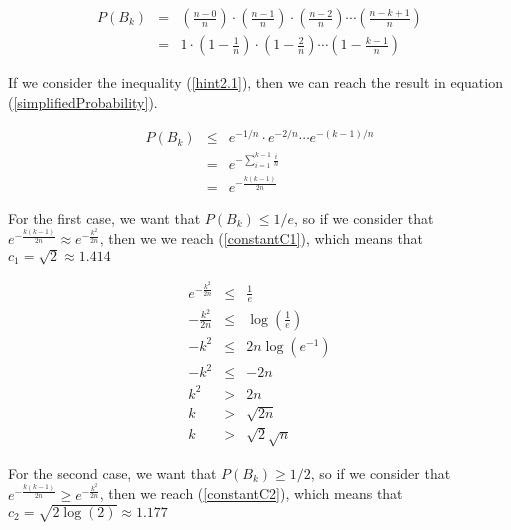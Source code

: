 \documentclass[tikz, 12pt]{scrartcl}
\begin{document}
\begin{enumerate}
	\begin{eqnarray}
	P(B_k) 	&	=	&	\left( \frac{n - 0}{n} \right) \cdot  \left( \frac{n - 1}{n} \right) \cdot \left( \frac{n - 2}{n} \right)\cdots\left( \frac{n - k + 1}{n} \right) \nonumber \\
			&	=	&	1 \cdot \left(1 -  \frac{1}{n} \right)\cdot \left(1 -  \frac{2}{n} \right) \cdots \left(1 -  \frac{k-1}{n} \right)\label{probabilityGeneral}
	\end{eqnarray}
	
	If we consider the inequality (\ref{hint2.1}), then we can reach the result in equation (\ref{simplifiedProbability}).
	
	\begin{eqnarray}
	P(B_k)	&	\leq	&	e^{-1/n} \cdot e^{-2/n} \cdots e^{-(k - 1)/n} \nonumber \\
			&	=	&	e^{-\sum_{i = 1}^{k -1} \frac{i}{n}} \nonumber \\
			&	=	&	e^{-\frac{k(k-1)}{2n}} \label{simplifiedProbability}
	\end{eqnarray}
	
	For the first case, we want that $P(B_{k}) \leq 1/e$, so if we consider that  $e^{-\frac{k(k-1)}{2n}} \approx e^{-\frac{k^2}{2n}} $, then we we reach (\ref{constantC1}), which means that $c_1 = \sqrt{2} \approx 1.414$
	
	\begin{eqnarray}
	{\displaystyle e^{-\frac{k^2}{2n}} }		&	\leq	&	\frac{1}{e} \nonumber \\
	-\frac{k^2}{2n}						&	\leq &	\log\left(\frac{1}{e}\right) \nonumber \\
	-k^2								& 	\leq & 2n \log(e^{-1}) \nonumber \\
	-k^2								&	\leq	& -2n  \nonumber \\
	k^2								& 	>	& 2  n \nonumber \\
	k								&	>	&	\sqrt{ 2 n} \nonumber \\
	k								&	>	&	\sqrt{ 2}\sqrt{n} \label{constantC1}
	\end{eqnarray}

	
	For the second case, we want that $P(B_{k}) \geq 1/2$, so if we consider that $e^{-\frac{k(k-1)}{2n}} \geq e^{-\frac{k^2}{2n}} $, then we reach (\ref{constantC2}), which means that $c_2 = \sqrt{ 2 \log(2)} \approx 1.177$
	

\end{enumerate}
\end{document}
